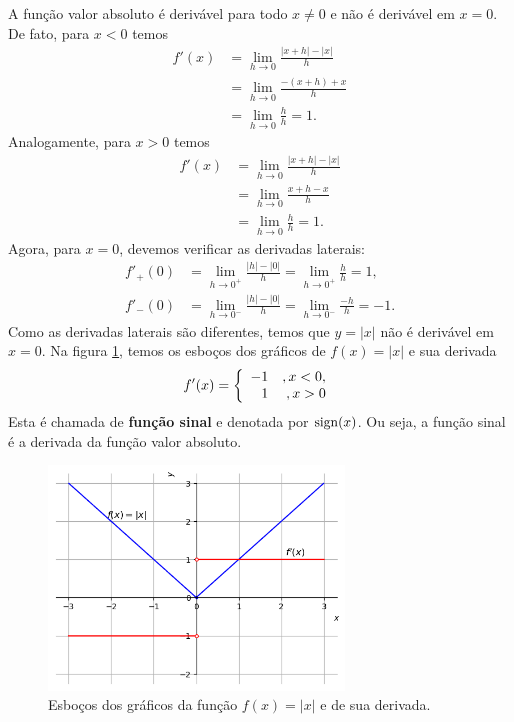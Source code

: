\begin{ex}
  A função valor absoluto é derivável para todo $x\neq 0$ e não é derivável em $x=0$. De fato, para $x<0$ temos
  \begin{align}
    f'(x) &= \lim_{h\to 0} \frac{|x+h|-|x|}{h}\\
          &= \lim_{h\to 0} \frac{-(x+h)+x}{h}\\
          &= \lim_{h\to 0} \frac{h}{h} = 1.
  \end{align}
  Analogamente, para $x>0$ temos
  \begin{align}
    f'(x) &= \lim_{h\to 0} \frac{|x+h|-|x|}{h}\\
          &= \lim_{h\to 0} \frac{x+h-x}{h}\\
          &= \lim_{h\to 0} \frac{h}{h} = 1.
  \end{align}
  Agora, para $x=0$, devemos verificar as derivadas laterais:
  \begin{align}
    f'_+(0) &= \lim_{h\to 0^+} \frac{|h|-|0|}{h} = \lim_{h\to 0^+} \frac{h}{h} = 1,\\
    f'_-(0) &= \lim_{h\to 0^-} \frac{|h|-|0|}{h} = \lim_{h\to 0^-} \frac{-h}{h} = -1.
  \end{align}
  Como as derivadas laterais são diferentes, temos que $y = |x|$ não é derivável em $x=0$. Na figura \ref{fig:deriv_ex_ffl_absx}, temos os esboços dos gráficos de $f(x) = |x|$ e sua derivada
  \begin{equation}\label{eq:deriv_signx}
    f'(x) = \left\{
      \begin{array}[H]{rr}
        -1 &, x<0,\\
        1 &, x> 0
      \end{array}
    \right.
  \end{equation}
  Esta é chamada de {\bf função sinal} e denotada por $\operatorname{sign}(x)$. Ou seja, a função sinal é a derivada da função valor absoluto.

  \begin{figure}[H]
    \centering
    \includegraphics[width=0.7\textwidth]{./cap_deriv/dados/fig_deriv_ex_ffl_absx/fig_deriv_ex_ffl_absx}
    \caption{Esboços dos gráficos da função $f(x)=|x|$ e de sua derivada.}
    \label{fig:deriv_ex_ffl_absx}
  \end{figure}


\end{ex}

